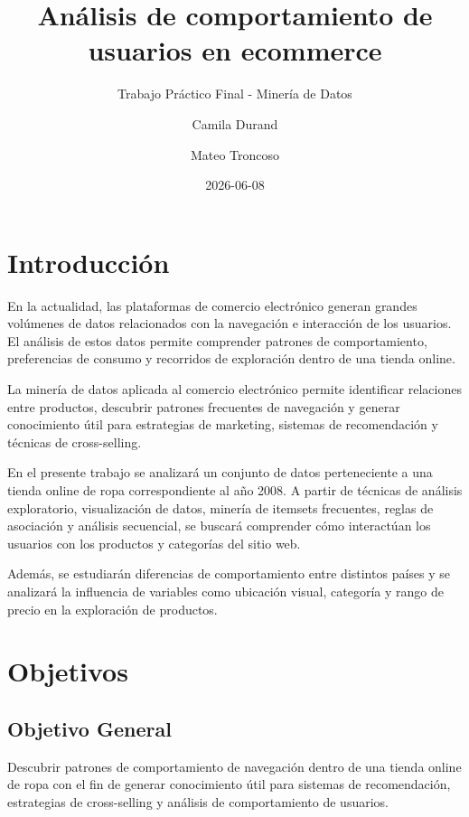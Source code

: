\documentclass[
  11pt,
  letterpaper,
  DIV=11,
  numbers=noendperiod]{scrartcl}
\title{Análisis de comportamiento de usuarios en ecommerce}
\subtitle{Trabajo Práctico Final - Minería de Datos}
\author{Camila Durand \and Mateo Troncoso}
\date{2026-06-08}
\renewcommand*\contentsname{Table of contents}
\newcommand\contentsname{Table of contents}
\begin{document}
\maketitle

\renewcommand*\contentsname{Table of contents}
{
\setcounter{tocdepth}{3}
\tableofcontents
}

\section{Introducción}\label{introducciuxf3n}

En la actualidad, las plataformas de comercio electrónico generan
grandes volúmenes de datos relacionados con la navegación e interacción
de los usuarios. El análisis de estos datos permite comprender patrones
de comportamiento, preferencias de consumo y recorridos de exploración
dentro de una tienda online.

La minería de datos aplicada al comercio electrónico permite identificar
relaciones entre productos, descubrir patrones frecuentes de navegación
y generar conocimiento útil para estrategias de marketing, sistemas de
recomendación y técnicas de cross-selling.

En el presente trabajo se analizará un conjunto de datos perteneciente a
una tienda online de ropa correspondiente al año 2008. A partir de
técnicas de análisis exploratorio, visualización de datos, minería de
itemsets frecuentes, reglas de asociación y análisis secuencial, se
buscará comprender cómo interactúan los usuarios con los productos y
categorías del sitio web.

Además, se estudiarán diferencias de comportamiento entre distintos
países y se analizará la influencia de variables como ubicación visual,
categoría y rango de precio en la exploración de productos.

\section{Objetivos}\label{objetivos}

\subsection{Objetivo General}\label{objetivo-general}

Descubrir patrones de comportamiento de navegación dentro de una tienda
online de ropa con el fin de generar conocimiento útil para sistemas de
recomendación, estrategias de cross-selling y análisis de comportamiento
de usuarios.
\end{document}
